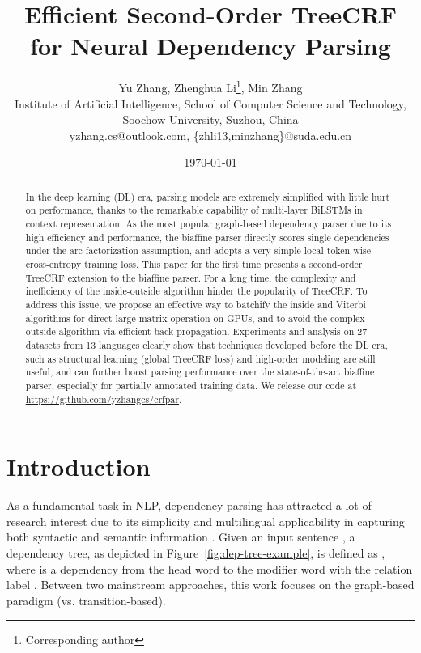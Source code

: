 \documentclass[11pt,a4paper]{article}
\title{Efficient Second-Order TreeCRF for Neural Dependency Parsing}
\author{
    Yu Zhang,
    Zhenghua Li\thanks{Corresponding author},
    Min Zhang \\
    Institute of Artificial Intelligence, School of Computer Science and Technology, \\
    Soochow University, Suzhou, China \\
    {yzhang.cs@outlook.com, \{zhli13,minzhang\}@suda.edu.cn}
}
\date{\today}
\begin{document}
\maketitle

\begin{abstract}
\label{section:abstract}
In the deep learning (DL) era, parsing models are extremely simplified with little hurt on performance, thanks to the remarkable capability of multi-layer BiLSTMs in context representation.
As the most popular graph-based dependency parser
due to its high efficiency and performance, the biaffine parser directly scores single dependencies under the arc-factorization assumption, and adopts a very simple local token-wise cross-entropy training loss.
This paper for the first time presents a second-order TreeCRF extension to the biaffine parser.
For a long time, the complexity and inefficiency of the inside-outside algorithm hinder the popularity of TreeCRF.
To address this issue, we propose an effective way to batchify the inside and Viterbi algorithms for direct large matrix operation on GPUs, and to avoid the complex outside algorithm via efficient back-propagation.
Experiments and analysis on 27 datasets from 13 languages clearly show that techniques developed before the DL era, such as structural learning (global TreeCRF loss) and high-order modeling are still useful, and can further boost parsing performance over the state-of-the-art biaffine parser, especially for partially annotated training data.
We release our code at \url{https://github.com/yzhangcs/crfpar}.
\end{abstract} \section{Introduction}
\label{section:introduction}

As a fundamental task in NLP, dependency parsing has attracted a lot of research interest due to its simplicity and multilingual applicability in capturing both syntactic and semantic information \cite{nivre-lrec2016-UD1.0}.
Given an input sentence ,
a dependency tree, as depicted in Figure~\ref{fig:dep-tree-example}, is defined as ,
where  is a dependency from the head word  to the modifier word  with the relation label .
Between two mainstream approaches, this work focuses on the graph-based paradigm (vs. transition-based).
\end{document}
